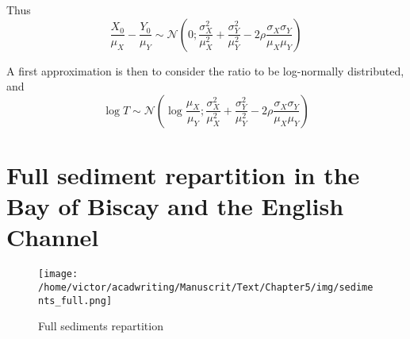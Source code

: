 \documentclass[../../Main_ManuscritThese.tex]{subfiles}
\begin{document}
  Thus
  \begin{equation}
    \frac{X_0}{\mu_X} - \frac{Y_0}{\mu_Y} \sim \mathcal{N}\left(0;\frac{\sigma^2_X}{\mu_X^2} + \frac{\sigma^2_Y}{\mu_Y^2} - 2 \rho \frac{\sigma_X \sigma_Y}{\mu_X \mu_Y} \right)
  \end{equation}
  
  A first approximation is then to consider the ratio to be log-normally distributed, and
  \begin{equation}
    \log T \sim \mathcal{N}\left(\log \frac{\mu_X}{\mu_Y}; \frac{\sigma^2_X}{\mu_X^2} + \frac{\sigma^2_Y}{\mu_Y^2} - 2 \rho \frac{\sigma_X \sigma_Y}{\mu_X \mu_Y} \right)
  \end{equation}
  


\newpage
\section{Full sediment repartition in the Bay of Biscay and the English Channel}
 \label{sec:sediments_full}
\begin{figure}[ht]
  \centering
  \texttt{[image: /home/victor/acadwriting/Manuscrit/Text/Chapter5/img/sediments\_full.png]}
  \caption{\label{fig:sediments_full} Full sediments repartition}
\end{figure}
\end{document}
